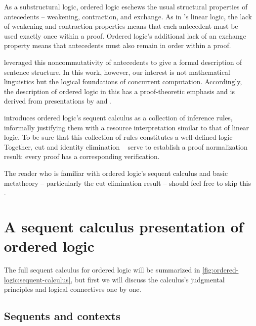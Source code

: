 As a substructural logic, ordered logic eschews the usual structural properties of antecedents -- weakening, contraction, and exchange.
As in \citeauthor{Girard:TCS87}'s linear logic\autocite{Girard:TCS87}, the lack of weakening and contraction properties means that each antecedent must be used exactly once within a proof.
Ordered logic's additional lack of an exchange property means that antecedents must also remain in order within a proof.

 leveraged this noncommutativity of antecedents to give a formal description of sentence structure.
In this work, however, our interest is not mathematical linguistics but the logical foundations of concurrent computation.
Accordingly, the description of ordered logic in this  has a proof-theoretic emphasis and is derived from presentations by \textcite{Pfenning:CMU16} and \textcite{Polakow+Pfenning:MFPS99}.

 introduces ordered logic's sequent calculus as a collection of inference rules, informally justifying them with a resource interpretation similar to that of linear logic.
To be sure that this collection of rules constitutes a well-defined logic
Together, cut and identity elimination ~ serve to establish a proof normalization result: every proof has a corresponding verification.


The reader who is familiar with ordered logic's sequent calculus and basic metatheory -- particularly the cut elimination result -- should feel free to skip this .


\section{A sequent calculus presentation of ordered logic}\label{sec:ordered-logic:sequent-calculus}

The full sequent calculus for ordered logic will be summarized in \cref{fig:ordered-logic:sequent-calculus}, but first we will discuss the calculus's judgmental principles and logical connectives one by one.

\subsection{Sequents and contexts}


